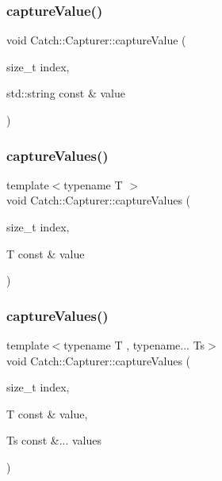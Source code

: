 \subsubsection{\texorpdfstring{captureValue()}{captureValue()}}
{\footnotesize\ttfamily void Catch\+::\+Capturer\+::capture\+Value (\begin{DoxyParamCaption}\item[{size\+\_\+t}]{index,  }\item[{std\+::string const \&}]{value }\end{DoxyParamCaption})}

\mbox{\label{class_catch_1_1_capturer_a60d08e6db2e54740bb2298bbbec3bc0b}} 
\subsubsection{\texorpdfstring{captureValues()}{captureValues()}\hspace{0.1cm}{\footnotesize\ttfamily [1/2]}}
{\footnotesize\ttfamily template$<$typename T $>$ \\
void Catch\+::\+Capturer\+::capture\+Values (\begin{DoxyParamCaption}\item[{size\+\_\+t}]{index,  }\item[{T const \&}]{value }\end{DoxyParamCaption})\hspace{0.3cm}{\ttfamily [inline]}}

\mbox{\label{class_catch_1_1_capturer_a76f2a097cfeb3042688300b81eb9bcbc}} 
\subsubsection{\texorpdfstring{captureValues()}{captureValues()}\hspace{0.1cm}{\footnotesize\ttfamily [2/2]}}
{\footnotesize\ttfamily template$<$typename T , typename... Ts$>$ \\
void Catch\+::\+Capturer\+::capture\+Values (\begin{DoxyParamCaption}\item[{size\+\_\+t}]{index,  }\item[{T const \&}]{value,  }\item[{Ts const \&...}]{values }\end{DoxyParamCaption})\hspace{0.3cm}{\ttfamily [inline]}}



